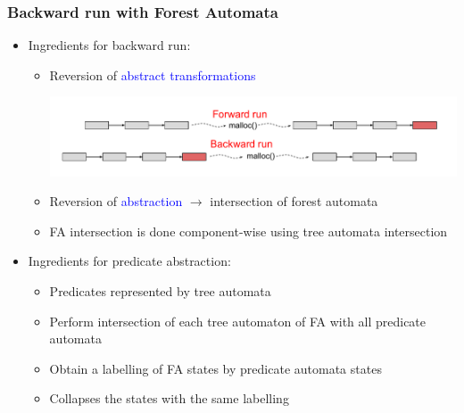 \documentclass{beamer}
\newcommand{\hlbl}[1]{\textcolor{blue}{#1}}
\newcommand{\hlgr}[1]{\textcolor{olive!50!green}{#1}}
\begin{document}
\begin{frame}
\frametitle{Backward run with Forest Automata}
		\begin{itemize}
		\item \hlgr{Ingredients for backward run}:
		\begin{itemize}
			\item Reversion of \hlbl{abstract transformations}
			\begin{center}
				\includegraphics[scale=0.4]{ex/at.pdf}
			\end{center}
			\item Reversion of \hlbl{abstraction} $\rightarrow$ intersection of forest automata
			\item FA intersection is done component-wise using tree automata intersection
		\end{itemize}
		\item \hlgr{Ingredients for predicate abstraction}:
		\begin{itemize}
			\item Predicates represented by tree automata
			\item Perform intersection of each tree automaton of FA with all predicate automata
			\item Obtain a labelling of FA states by predicate automata states
			\item Collapses the states with the same labelling
		\end{itemize}
	\end{itemize}

\end{frame}

\end{document}
